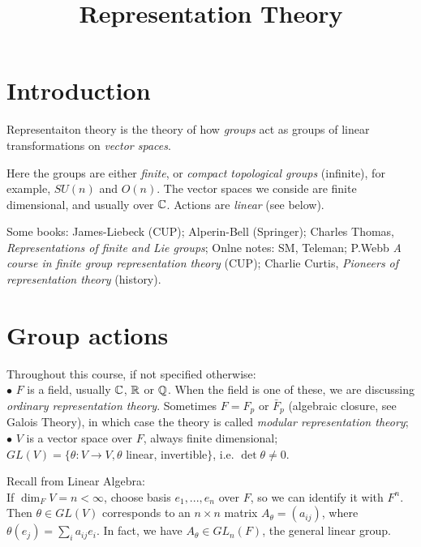\documentclass[a4paper]{article}
\begin{document}
\title{Representation Theory}

\maketitle

\newpage

\tableofcontents

\newpage

\section{Introduction}
Representaiton theory is the theory of how \emph{groups} act as groups of linear transformations on \emph{vector spaces}. 

Here the groups are either \emph{finite}, or \emph{compact topological groups} (infinite), for example, $SU(n)$ and $O(n)$. The vector spaces we conside are finite dimensional, and usually over $\mathbb{C}$. Actions are \emph{linear} (see below).

Some books: James-Liebeck (CUP); Alperin-Bell (Springer); Charles Thomas, \emph{Representations of finite and Lie groups}; Onlne notes: SM, Teleman; P.Webb \emph{A course in finite group representation theory} (CUP); Charlie Curtis, \emph{Pioneers of representation theory} (history).

\newpage

\section{Group actions}

Throughout this course, if not specified otherwise:\\
$\bullet$ $F$ is a field, usually $\mathbb{C}$, $\mathbb{R}$ or $\mathbb{Q}$. When the field is one of these, we are discussing \emph{ordinary representation theory}. Sometimes $F=F_p$ or $\bar{F}_p$ (algebraic closure, see Galois Theory), in which case the theory is called \emph{modular representation theory};\\
$\bullet$ $V$ is a vector space over $F$, always finite dimensional;\\
$GL(V) =\{\theta : V \to V, \theta$ linear, invertible$\}$, i.e. $\det \theta \neq 0$.

Recall from Linear Algebra:\\
If $\dim_F V = n < \infty$, choose basis $e_1,...,e_n$ over $F$, so we can identify it with $F^n$. Then $\theta \in GL(V)$ corresponds to an $n \times n$ matrix $A_\theta = (a_{ij})$, where $\theta(e_j) = \sum_i a_{ij} e_i$. In fact, we have $A_\theta \in GL_n(F)$, the general linear group.
\end{document}
